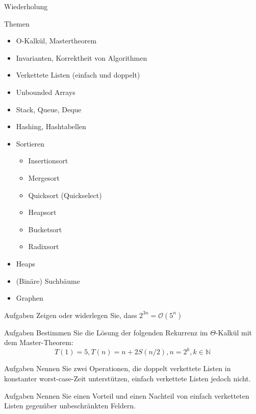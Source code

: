 \begin{frame}
	\begin{center}
		\Huge
		Wiederholung
	\end{center}
\end{frame}

\begin{frame}{Themen}
	\begin{itemize}
		\item O-Kalkül, Mastertheorem
		\item Invarianten, Korrektheit von Algorithmen
		\item Verkettete Listen (einfach und doppelt)
		\item Unbounded Arrays
		\item Stack, Queue, Deque
		\item Hashing, Hashtabellen
		\item Sortieren
			\begin{itemize}
				\item Insertionsort
				\item Mergesort
				\item Quicksort (Quickselect)
				\item Heapsort
				\item Bucketsort
				\item Radixsort
			\end{itemize}
		\item Heaps
		\item (Binäre) Suchbäume
		\item Graphen
	\end{itemize}
\end{frame}

\begin{frame}{Aufgaben}
	Zeigen oder widerlegen Sie, dass $2^{3n} = \mathcal{O}(5^n)$
\end{frame}

\begin{frame}{Aufgaben}
	Bestimmen Sie die Lösung der folgenden Rekurrenz im $\Theta$-Kalkül mit dem Master-Theorem:
	$$ T(1) = 5, T(n) = n + 2 S(n/2), n = 2^k, k \in \mathbb{N}$$
\end{frame}

\begin{frame}{Aufgaben}
	Nennen Sie zwei Operationen, die doppelt verkettete Listen in konstanter worst-case-Zeit unterstützen, einfach verkettete Listen jedoch nicht.
\end{frame}

\begin{frame}{Aufgaben}
	Nennen Sie einen Vorteil und einen Nachteil von einfach verketteten Listen gegenüber unbeschränkten Feldern.
\end{frame}


